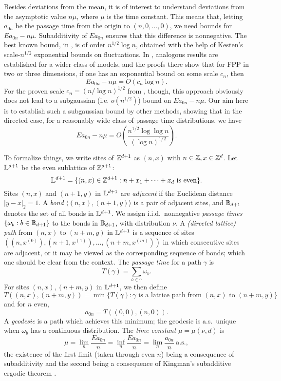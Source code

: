 \documentclass[12pt]{amsart}
\theoremstyle{plain}
\theoremstyle{definition}
\numberwithin{equation}{section}
\begin{document}
Besides deviations from the mean, it is of interest to understand deviations from the asymptotic value $n\mu$, where $\mu$ is the time constant.  This means that, letting $a_{0n}$ be the passage time from the origin to $(n,0,...,0)$, we need bounds for $Ea_{0n} - n\mu$.  Subadditivity of $Ea_{0n}$ ensures that this difference is nonnegative.  The best known bound, in \cite{Al93}, is of order $n^{1/2}\log n$, obtained with the help of Kesten's scale-$n^{1/2}$ exponential bounds on fluctuations.  In \cite{Al97}, analogous results are established for a wider class of models, and the proofs there show that for FPP in two or three dimensions, if one has an exponential bound on some scale $c_n$, then 
\begin{equation} \label{cnbound}
  Ea_{0n} - n\mu = O(c_n\log n).
  \end{equation}
For the proven scale $c_n = (n/\log n)^{1/2}$ from \cite{BR08}, though, this approach obviously does not lead to a subgaussian (i.e. $o(n^{1/2})$) bound on $Ea_{0n} - n\mu$.  Our aim here is to establish such a subgaussian bound by other methods, showing that in the directed case, for a reasonably wide class of passage time distributions, we have
\begin{equation} \label{rate}
  Ea_{0n} - n\mu = O\left( \frac{n^{1/2}\log \log n}{(\log n)^{1/2}} \right).
  \end{equation}
  
To formalize things, we write sites of $\mathbb{Z}^{d+1}$ as $(n,x)$ with $n \in \mathbb{Z}, x \in \mathbb{Z}^d$.  Let $\mathbb{L}^{d+1}$ be the even sublattice of $\mathbb{Z}^{d+1}$:
\[
  \mathbb{L}^{d+1} = \{(n,x) \in \mathbb{Z}^{d+1}: n+x_1 + \dots + x_d \text{ is even}\}.
  \]
Sites $(n,x)$ and $(n+1,y)$ in $\mathbb{L}^{d+1}$ are \emph{adjacent} if the Euclidean distance $|y-x|_2=1$.  A \emph{bond} $\langle (n,x),(n+1,y) \rangle$ is a pair of adjacent sites, and $\mathbb{B}_{d+1}$ denotes the set of all bonds in $\mathbb{L}^{d+1}$.  We assign i.i.d.~nonnegative \emph{passage times} $\{\omega_b: b \in \mathbb{B}_{d+1}\}$ to the bonds in $\mathbb{B}_{d+1}$, with distribution $\nu$.  A \emph{(directed lattice) path} from $(n,x)$ to $(n+m,y)$ in $\mathbb{L}^{d+1}$ is a sequence of sites $((n,x^{(0)}),(n+1,x^{(1)}),\dots,(n+m,x^{(m)}))$ in which consecutive sites are adjacent, or it may be viewed as the corresponding sequence of bonds; which one should be clear from the context.  The \emph{passage time} for a path $\gamma$ is 
\[
  T(\gamma) = \sum_{b \in \gamma} \omega_b.
  \]
For sites $(n,x),(n+m,y)$ in $\mathbb{L}^{d+1}$, we then define
\[
  T((n,x),(n+m,y)) = \min\{T(\gamma):  \gamma \text{ is a lattice path from $(n,x)$ to } (n+m,y)\}
  \]
and for $n$ even,
\[
  a_{0n} = T((0,0),(n,0)).
  \]
A \emph{geodesic} is a path which achieves this minimum; the geodesic is a.s.~unique when $\omega_b$ has a continuous distribution.  The \emph{time constant} $\mu=\mu(\nu,d)$ is 
\begin{equation} \label{mudef}
  \mu = \lim_n \frac{Ea_{0n}}{n} = \inf_n \frac{Ea_{0n}}{n} = \lim_n \frac{a_{0n}}{n}\ \text{a.s.},
  \end{equation}
the existence of the first limit (taken through even $n$) being a consequence of subadditivity and the second being a consequence of Kingman's subadditive ergodic theorem \cite{Ki68}.  
\end{document}
